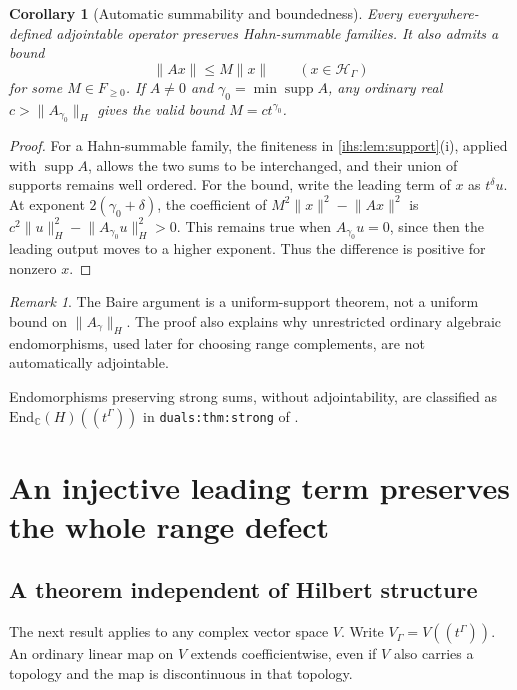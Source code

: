 \documentclass[11pt,a4paper]{article}
\numberwithin{equation}{section}
\newtheorem{corollary}[corollary]{Corollary}
\theoremstyle{definition}
\theoremstyle{remark}
\newtheorem{remark}[remark]{Remark}
\newcommand{\C}{\mathbb C}
\newcommand{\Fld}{F}
\newcommand{\Hil}{\mathcal H_\Gamma}
\newcommand{\supp}{\operatorname{supp}}
\newcommand{\norm}[1]{\lVert#1\rVert}
\begin{document}
\begin{corollary}[Automatic summability and boundedness]\label{ihs:hh:cor:autobounded}
Every everywhere-defined adjointable operator preserves Hahn-summable
families. It also admits a bound
\begin{equation}\label{ihs:hh:eq:orderbound}
 \norm{Ax}\le M\norm{x}\qquad(x\in\Hil)
\end{equation}
for some $M\in\Fld_{\ge0}$. If $A\ne0$ and $\gamma_0=\min\supp A$, any
ordinary real $c>\norm{A_{\gamma_0}}_H$ gives the valid bound
$M=c t^{\gamma_0}$.
\end{corollary}
\begin{proof}
For a Hahn-summable family, the finiteness in \cref{ihs:lem:support}(i),
applied with $\supp A$, allows the two sums to be interchanged, and their
union of supports remains well ordered. For the bound, write the leading
term of $x$ as $t^\delta u$. At exponent $2(\gamma_0+\delta)$, the
coefficient of $M^2\norm{x}^2-\norm{Ax}^2$ is
$c^2\norm{u}_H^2-\norm{A_{\gamma_0}u}_H^2>0$. This remains true when
$A_{\gamma_0}u=0$, since then the leading output moves to a higher exponent.
Thus the difference is positive for nonzero $x$.
\end{proof}

\begin{remark}\label{ihs:hh:rem:baire}
The Baire argument is a uniform-support theorem, not a uniform bound on
$\norm{A_\gamma}_H$. The proof also explains why unrestricted ordinary
algebraic endomorphisms, used later for choosing range complements, are not
automatically adjointable.
\end{remark}

Endomorphisms preserving strong sums, without adjointability, are classified
as $\mathrm{End}_\C(H)((t^\Gamma))$ in \texttt{duals:thm:strong} of
.

\section{An injective leading term preserves the whole range defect}\label{ihs:hh:sec:defect}

\subsection{A theorem independent of Hilbert structure}\label{ihs:hh:sec:defectthm}
The next result applies to any complex vector space $V$. Write
$V_\Gamma=V((t^\Gamma))$. An ordinary linear map on $V$ extends
coefficientwise, even if $V$ also carries a topology and the map is
discontinuous in that topology.
\end{document}
